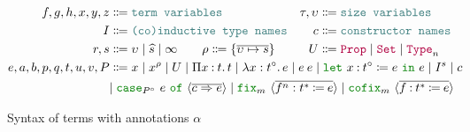 \begin{figure}
\centering
\begin{align*}
f, g, h, x, y, z &\Coloneqq \meta{term variables} &
\tau, \upsilon &\Coloneqq \meta{size variables} \\
I &\Coloneqq \meta{(co)inductive type names} &
c &\Coloneqq \meta{constructor names} \\
r, s &\Coloneqq \upsilon \mid \succ{s} \mid \infty \qquad
\rho \Coloneqq \set{\vec{\upsilon \mapsto s}} &
U &\Coloneqq \Prop \mid \Set \mid \Type{n} \\
e, a, b, p, q, t, u, v, P &\Coloneqq \mathrlap{x \mid x^{\rho} \mid U \mid \prod{x}{t}{t} \mid \abs{x}{t^\circ}{e} \mid \app{e}{e} \mid \letin{x}{t^\circ}{e}{e} \mid I^s \mid c} \\
&\mathrlap{\mid \caseof{P^\circ}{e}{c}{e} \mid \fix{m}{f^n}{t^*}{e} \mid \cofix{m}{f}{t^*}{e}}
\end{align*}
\caption{Syntax of \lang terms with annotations $\alpha$}
\label{fig:terms-general}
\end{figure}

